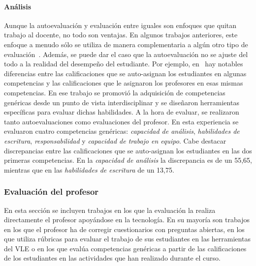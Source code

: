 \paragraph*{Análisis}
Aunque la autoevaluación y evaluación entre iguales son enfoques que quitan trabajo al docente, no todo son ventajas. En algunos trabajos anteriores, este enfoque a menudo sólo se utiliza de manera complementaria a algún otro tipo de evaluación~\cite{lasa2013problem,sevilla2012assessment}. Además, se puede dar el caso que la autoevaluación no se ajuste del todo a la realidad del desempeño del estudiante. Por ejemplo, en~\cite{carreras2013promotion} hay notables diferencias entre las calificaciones que se auto-asignan los estudiantes en algunas competencias y las calificaciones que le asignaron los profesores en esas mismas competencias. En ese trabajo se promovió la adquisición de competencias genéricas desde un punto de vista interdisciplinar y se diseñaron herramientas específicas para evaluar dichas habilidades. A la hora de evaluar, se realizaron tanto autoevaluaciones como evaluaciones del profesor. En esta experiencia se evaluaron cuatro competencias genéricas: \emph{capacidad de análisis},  \emph{habilidades de escritura}, \emph{responsabilidad} y \emph{capacidad de trabajo en equipo}. Cabe destacar discrepancias entre las calificaciones que se auto-asignan los estudiantes en las dos primeras competencias. En la \emph{capacidad de análisis} la discrepancia es de un 55,65\percentage, mientras que en las \emph{habilidades de escritura} de un 13,75\percentage.


\subsubsection{Evaluación del profesor}

En esta sección se incluyen trabajos en los que la evaluación la realiza directamente el profesor apoyándose en la tecnología. En su mayoría son trabajos en los que el profesor ha de corregir cuestionarios con preguntas abiertas, en los que utiliza rúbricas para evaluar el trabajo de sus estudiantes en las herramientas del VLE o en los que evalúa competencias genéricas a partir de las calificaciones de los estudiantes en las actividades que han realizado durante el curso. 


